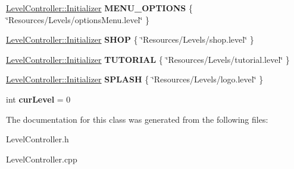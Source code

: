 \begin{DoxyCompactItemize}
\item 
\hypertarget{class_level_controller_a062b3091693fbfeb9140431659899ad7}{\hyperlink{class_level_controller_1_1_initializer}{Level\+Controller\+::\+Initializer} {\bfseries M\+E\+N\+U\+\_\+\+O\+P\+T\+I\+O\+N\+S} \{ \char`\"{}Resources/Levels/options\+Menu.\+level\char`\"{} \}}\label{class_level_controller_a062b3091693fbfeb9140431659899ad7}

\item 
\hypertarget{class_level_controller_a3cc829ed89f8a4fad54369bcdb10e985}{\hyperlink{class_level_controller_1_1_initializer}{Level\+Controller\+::\+Initializer} {\bfseries S\+H\+O\+P} \{ \char`\"{}Resources/Levels/shop.\+level\char`\"{} \}}\label{class_level_controller_a3cc829ed89f8a4fad54369bcdb10e985}

\item 
\hypertarget{class_level_controller_ab0acb0362eba763e16c89d694f97d7f7}{\hyperlink{class_level_controller_1_1_initializer}{Level\+Controller\+::\+Initializer} {\bfseries T\+U\+T\+O\+R\+I\+A\+L} \{ \char`\"{}Resources/Levels/tutorial.\+level\char`\"{} \}}\label{class_level_controller_ab0acb0362eba763e16c89d694f97d7f7}

\item 
\hypertarget{class_level_controller_a74aa85b7436b80624576389e3b826aca}{\hyperlink{class_level_controller_1_1_initializer}{Level\+Controller\+::\+Initializer} {\bfseries S\+P\+L\+A\+S\+H} \{ \char`\"{}Resources/Levels/logo.\+level\char`\"{} \}}\label{class_level_controller_a74aa85b7436b80624576389e3b826aca}

\item 
\hypertarget{class_level_controller_a0ad1fce1b2965afaa83df3c5a8905e5b}{int {\bfseries cur\+Level} = 0}\label{class_level_controller_a0ad1fce1b2965afaa83df3c5a8905e5b}

\end{DoxyCompactItemize}


The documentation for this class was generated from the following files\+:\begin{DoxyCompactItemize}
\item 
Level\+Controller.\+h\item 
Level\+Controller.\+cpp\end{DoxyCompactItemize}
